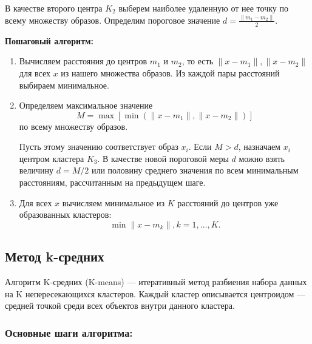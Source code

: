 \documentclass[11pt]{article}
\begin{document}
В качестве второго центра $K_2$ выберем наиболее удаленную от нее точку по всему множеству образов. Определим пороговое значение $d = \frac{\|m_1 - m_2\|}{2}$.

\textbf{Пошаговый алгоритм:}

\begin{enumerate}
    \item Вычисляем расстояния до центров $m_1$ и $m_2$, то есть $\|x - m_1\|, \|x - m_2\|$ для всех $x$ из нашего множества образов. Из каждой пары расстояний выбираем минимальное.
    
    \item Определяем максимальное значение
    \[
    M = \max[\min(\|x - m_1\|, \|x - m_2\|)]
    \]
    по всему множеству образов.
    
    Пусть этому значению соответствует образ $x_i$. Если $M > d$, назначаем $x_i$ центром кластера $K_3$. В качестве новой пороговой меры $d$ можно взять величину $d = M/2$ или половину среднего значения по всем минимальным расстояниям, рассчитанным на предыдущем шаге.
    
    \item Для всех $x$ вычисляем минимальное из $K$ расстояний до центров уже образованных кластеров:
    \[
    \min\|x - m_k\|, k = 1,\dots, K.
    \]
\end{enumerate}

\subsection{Метод k-средних}

Алгоритм K-средних (K-means) — итеративный метод разбиения набора данных на K непересекающихся кластеров. Каждый кластер описывается центроидом — средней точкой среди всех объектов внутри данного кластера.

\subsubsection{Основные шаги алгоритма:}
\end{document}
